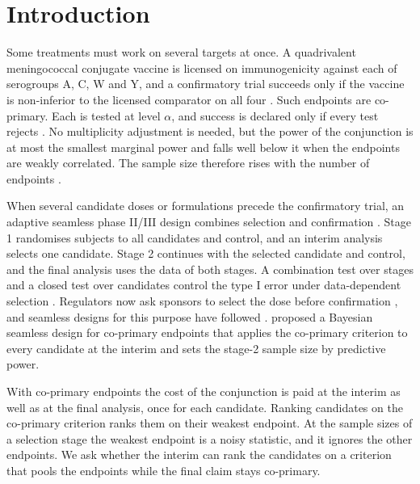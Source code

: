 \section{Introduction}\label{sec:intro}

Some treatments must work on several targets at once. A quadrivalent meningococcal conjugate vaccine is licensed on immunogenicity against each of serogroups A, C, W and Y, and a confirmatory trial succeeds only if the vaccine is non-inferior to the licensed comparator on all four \citep{yang2024,ostergaard2009}. Such endpoints are co-primary. Each is tested at level $\alpha$, and success is declared only if every test rejects \citep{berger1982}. No multiplicity adjustment is needed, but the power of the conjunction is at most the smallest marginal power and falls well below it when the endpoints are weakly correlated. The sample size therefore rises with the number of endpoints \citep{offen2007,chuangstein2007,sozu2010,hamasaki2018}.

When several candidate doses or formulations precede the confirmatory trial, an adaptive seamless phase II/III design combines selection and confirmation \citep{bauer1994,stallard2003,posch2005,bretz2006,jennison2007,stallard2011}. Stage 1 randomises subjects to all candidates and control, and an interim analysis selects one candidate. Stage 2 continues with the selected candidate and control, and the final analysis uses the data of both stages. A combination test over stages and a closed test over candidates control the type I error under data-dependent selection \citep{marcus1976,hommel2001}. Regulators now ask sponsors to select the dose before confirmation \citep{fda2024}, and seamless designs for this purpose have followed \citep{li2024,liu2026}. \citet{yang2024} proposed a Bayesian seamless design for co-primary endpoints that applies the co-primary criterion to every candidate at the interim and sets the stage-2 sample size by predictive power.

With co-primary endpoints the cost of the conjunction is paid at the interim as well as at the final analysis, once for each candidate. Ranking candidates on the co-primary criterion ranks them on their weakest endpoint. At the sample sizes of a selection stage the weakest endpoint is a noisy statistic, and it ignores the other endpoints. We ask whether the interim can rank the candidates on a criterion that pools the endpoints while the final claim stays co-primary.

